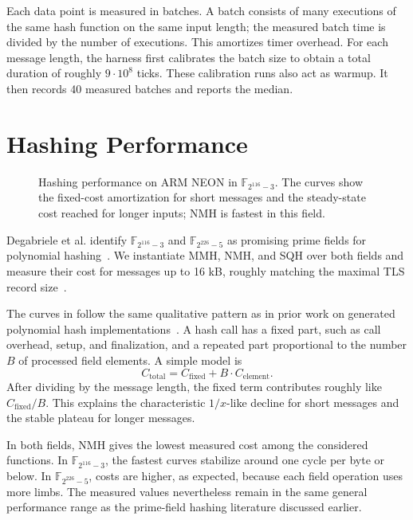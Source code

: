 Each data point is measured in batches. A batch consists of many executions of the same hash function on the same input length; the measured batch time is divided by the number of executions. This amortizes timer overhead. For each message length, the harness first calibrates the batch size to obtain a total duration of roughly \(9\cdot 10^8\) ticks. These calibration runs also act as warmup. It then records 40 measured batches and reports the median.

\section{Hashing Performance}
\label{sec:evaluation-hashing-performance}

\begin{figure}[!htbp]
    \centering
    \resizebox{\textwidth}{!}{%
        
    }
    \caption{Hashing performance on ARM NEON in \(\mathbb{F}_{2^{116}-3}\). The curves show the fixed-cost amortization for short messages and the steady-state cost reached for longer inputs; NMH is fastest in this field.}
    \label{fig:hashing_gf1163}
\end{figure}
\clearpage

Degabriele et al. identify \(\mathbb{F}_{2^{116}-3}\) and \(\mathbb{F}_{2^{226}-5}\) as promising prime fields for polynomial hashing~\cite{degabriele2024sok}. We instantiate MMH, NMH, and SQH over both fields and measure their cost for messages up to 16 kB, roughly matching the maximal TLS record size~\cite{rfc8446}.

The curves in  follow the same qualitative pattern as in prior work on generated polynomial hash implementations~\cite{pegolotti2026sphgen,degabriele2024sok}. A hash call has a fixed part, such as call overhead, setup, and finalization, and a repeated part proportional to the number \(B\) of processed field elements. A simple model is
\[
    C_{\mathrm{total}} = C_{\mathrm{fixed}} + B\cdot C_{\mathrm{element}}.
\]
After dividing by the message length, the fixed term contributes roughly like \(C_{\mathrm{fixed}}/B\). This explains the characteristic \(1/x\)-like decline for short messages and the stable plateau for longer messages.

In both fields, NMH gives the lowest measured cost among the considered functions. In \(\mathbb{F}_{2^{116}-3}\), the fastest curves stabilize around one cycle per byte or below. In \(\mathbb{F}_{2^{226}-5}\), costs are higher, as expected, because each field operation uses more limbs. The measured values nevertheless remain in the same general performance range as the prime-field hashing literature discussed earlier.

